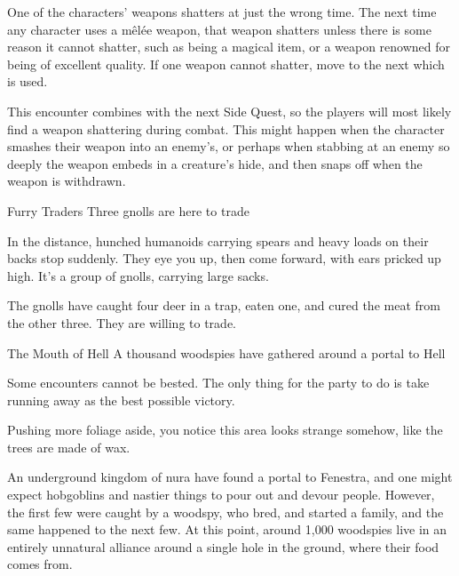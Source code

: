 \begin{multicols}{2}
\begin{boxtext}
\end{boxtext}

One of the characters' weapons shatters at just the wrong time.
The next time any character uses a m\^el\'ee weapon, that weapon shatters unless there is some reason it cannot shatter, such as being a magical item, or a weapon renowned for being of excellent quality.
If one weapon cannot shatter, move to the next which is used.

This encounter combines with the next Side Quest, so the players will most likely find a weapon shattering during combat.
This might happen when the character smashes their weapon into an enemy's, or perhaps when stabbing at an enemy so deeply the weapon embeds in a creature's hide, and then snaps off when the weapon is withdrawn.

{Furry Traders}%
{Three gnolls are here to trade}%

\begin{boxtext}

	In the distance, hunched humanoids carrying spears and heavy loads on their backs stop suddenly.
	They eye you up, then come forward, with ears pricked up high.
	It's a group of gnolls, carrying large sacks.

\end{boxtext}

The gnolls have caught four deer in a trap, eaten one, and cured the meat from the other three.  They are willing to trade.


{\N The Mouth of Hell}%
{A thousand woodspies have gathered around a portal to Hell}%

Some encounters cannot be bested. The only thing for the party to do is take running away as the best possible victory.

\begin{boxtext}

	Pushing more foliage aside, you notice this area looks strange somehow, like the trees are made of wax.

\end{boxtext}

An underground kingdom of nura have found a portal to Fenestra, and one might expect hobgoblins and nastier things to pour out and devour people.
However, the first few were caught by a woodspy, who bred, and started a family, and the same happened to the next few.
At this point, around 1,000 woodspies live in an entirely unnatural alliance around a single hole in the ground, where their food comes from.


\end{multicols}
